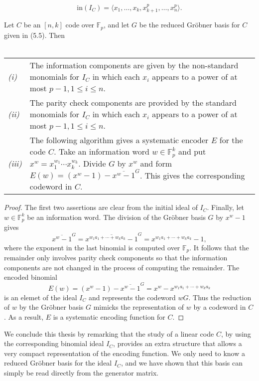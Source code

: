 \documentclass[english,bachelor]{liumaiex}
\begin{document}
\begin{displaymath}
\textrm{in}(I_C)=\langle x_1,\dots,x_k,x_{k+1}^p,\dots,x_n^p\rangle.
\end{displaymath}
\begin{thm}
Let $C$ be an $[n,k]$ code over $\mathbb{F}_p$, and let $G$ be the reduced Gröbner basis for $C$ given in (5.5). Then \\ \\
\begin{tabular}{lp{11cm}}
\emph{(i)} & The information components are given by the non-standard monomials for $I_C$ in which each $x_i$ appears to a power of at most $p-1, 1\leq i\leq n$.\\
\emph{(ii)} & The parity check components are provided by the standard monomials for $I_C$ in which each $x_i$ appears to a power of at most $p-1, 1\leq i\leq n$.\\
\emph{(iii)} & The following algorithm gives a systematic encoder $E$ for the code $C$. Take an information word $w\in\mathbb{F}_p^k$ and put $x^w=x_1^{w_1}\cdots x_k^{w_k}$. Divide $G$ by $x^w$ and form $E(w)=(x^w-1)-\overline{x^w-1}^G$. This gives the corresponding codeword in $C$.
\end{tabular}
\end{thm}

\begin{proof}
The first two assertions are clear from the initial ideal of $I_C$. Finally, let $w\in\mathbb{F}_p^k$ be an information word. The division of the Gröbner basis $G$ by $x^w-1$ gives
\begin{displaymath}
\overline{x^w-1}^G=\overline{x^{w_1a_1+\cdots+w_ka_k}-1}^G=x^{w_1a_1+\cdots+w_ka_k}-1,
\end{displaymath}
where the exponent in the last binomial is computed over $\mathbb{F}_p$. It follows that the remainder only involves parity check components so that the information components are not changed in the process of computing the remainder. The encoded binomial
\begin{displaymath}
E(w)=(x^w-1)-\overline{x^w-1}^G=x^w-x^{w_1a_1+\cdots+w_ka_k}
\end{displaymath}
is an elemet of the ideal $I_C$ and represents the codeword $wG$. Thus the reduction of $w$ by the Gröbner basis $G$ mimicks the representation of $w$ by a codeword in $C$. As a result, $E$ is a systematic encoding function for $C$.
\end{proof}
We conclude this thesis by remarking that the study of a linear code $C$, by using the corresponding binomial ideal $I_C$, provides an extra structure that allows a very compact representation of the encoding function. We only need to know a reduced Gröbner basis for the ideal $I_C$, and we have shown that this basis can simply be read directly from the generator matrix.
\end{document}
